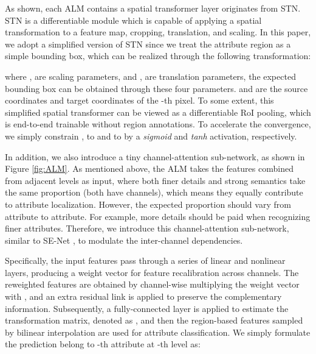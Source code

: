 \documentclass[10pt,twocolumn,letterpaper]{article}
\begin{document}
As shown, each ALM contains a spatial transformer layer originates from STN.
STN is a differentiable module which is capable of applying a spatial transformation to a feature map, \eg cropping, translation, and scaling.
In this paper, we adopt a simplified version of STN since we treat the attribute region as a simple bounding box, which can be realized through the following transformation:

where ,  are scaling parameters, and ,  are translation parameters, the expected bounding box can be obtained through these four parameters.
 and  are the source coordinates and target coordinates of the -th pixel.
To some extent, this simplified spatial transformer can be viewed as a differentiable RoI pooling, which is end-to-end trainable without region annotations.
To accelerate the convergence, we simply constrain , to  and  to  by a \textit{sigmoid} and \textit{tanh} activation, respectively.

In addition, we also introduce a tiny channel-attention sub-network, as shown in Figure \ref{fig:ALM}.
As mentioned above, the ALM takes the features combined from adjacent levels as input, where both finer details and strong semantics take the same proportion (both have  channels), which means they equally contribute to attribute localization.
However, the expected proportion should vary from attribute to attribute.
For example, more details should be paid when recognizing finer attributes.
Therefore, we introduce this channel-attention sub-network, similar to SE-Net \cite{hu2018squeeze}, to modulate the inter-channel dependencies.

Specifically, the input features  pass through a series of linear and nonlinear layers, producing a weight vector for feature recalibration across channels.
The reweighted features are obtained by channel-wise multiplying the weight vector with , and an extra residual link is applied to preserve the complementary information.
Subsequently, a fully-connected layer is applied to estimate the transformation matrix, denoted as , and then the region-based features sampled by bilinear interpolation are used for attribute classification.
We simply formulate the prediction belong to -th attribute at -th level as:
\end{document}
